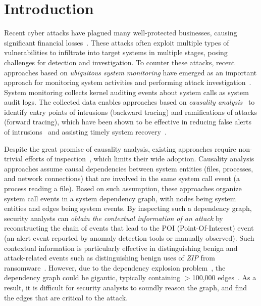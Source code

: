 \section{Introduction}
\label{sec:intro}


Recent cyber attacks have plagued many well-protected businesses, causing significant 
financial losses~\cite{ebay,opm,target,homedepot,ya:yahooleak,equifax,marriott}.
These attacks often exploit multiple types of vulnerabilities to infiltrate into target systems in multiple stages, posing challenges for detection and investigation.
To counter these attacks, recent approaches based on \emph{ubiquitous system monitoring} have emerged as an important approach for monitoring system activities and performing attack investigation~\cite{backtracking,backtracking2,wormlog,logtracking,mcitracking,liu2018priotracker,gao2018aiql,gao2018saql,gao2021enabling}.
System monitoring collects kernel auditing events about system calls as system audit logs.
The collected data enables approaches based on \textit{causality analysis}~\cite{backtracking,backtracking2,taser,intrusionrecovery,liu2018priotracker,mcitracking,hassan2019nodoze,ma2016protracer} to identify entry points of intrusions (backward tracing) and ramifications of attacks (forward tracing), 
which have been shown to be effective in reducing false alerts of intrusions~\cite{alertfp,alertfp2,hassan2019nodoze} and assisting timely system recovery~\cite{taser,intrusionrecovery}.

Despite the great promise of causality analysis, 
existing approaches require non-trivial efforts of inspection~\cite{auditcluster,hassan2019nodoze}, which limits their wide adoption.
Causality analysis approaches assume causal dependencies between system entities (\eg files, processes, and network connections) that are involved in the same system call event (\eg a process reading a file).
Based on such assumption, these approaches organize system call events in a system dependency graph, with nodes being system entities and edges being system events. 
By inspecting such a dependency graph, security analysts can \textit{obtain the contextual information of an attack} by reconstructing the chain of events that lead to the POI (Point-Of-Interest) event (\ie an alert event reported by anomaly detection tools or manually observed).
Such contextual information is particularly effective in distinguishing benign and attack-related events such as distinguishing benign uses of \textit{ZIP} from ransomware~\cite{hassan2019nodoze,ransomware}.
However, due to the dependency explosion problem~\cite{beep,reduction,reduction2}, the dependency graph could be gigantic, typically containing $>$100,000 edges~\cite{hassan2019nodoze,auditcluster}. 
As a result, it is difficult for security analysts to soundly reason the graph, and find the edges that are critical to the attack.


